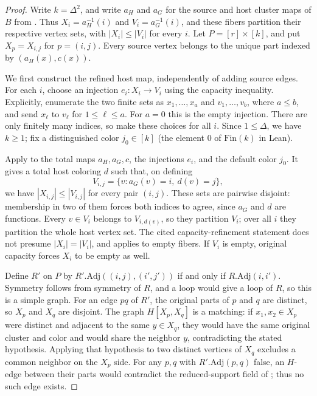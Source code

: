 \begin{proof}
Write $k=\Delta^2$, and write $a_H$ and $a_G$ for the source and host
cluster maps of $B$ from .  Thus
$X_i=a_H^{-1}(i)$ and $V_i=a_G^{-1}(i)$, and these fibers partition
their respective vertex sets, with $|X_i|\leq|V_i|$ for every $i$.
Let $P=[r]\times[k]$, and put $X_p=X_{i,j}$ for $p=(i,j)$.
Every source vertex belongs to the unique part indexed by
$(a_H(x),c(x))$.

We first construct the refined host map, independently of adding source
edges.  For each $i$, choose an injection $e_i:X_i\to V_i$ using the
capacity inequality.  Explicitly, enumerate the two finite sets as
$x_1,\ldots,x_a$ and $v_1,\ldots,v_b$, where $a\leq b$, and send
$x_\ell$ to $v_\ell$ for $1\leq\ell\leq a$.  For $a=0$ this is the
empty injection.  There are only finitely many indices, so make these
choices for all $i$.  Since $1\leq\Delta$, we have $k\geq1$; fix a
distinguished color $j_0\in[k]$ (the element $0$ of $\mathrm{Fin}(k)$
in Lean).

Apply  to the total maps
$a_H,a_G,c$, the injections $e_i$, and the default color $j_0$.
It gives a total host coloring $d$ such that, on defining
\[
 V_{i,j}=\{v:a_G(v)=i,\ d(v)=j\},
\]
we have $|X_{i,j}|\leq|V_{i,j}|$ for every pair $(i,j)$.
These sets are pairwise disjoint: membership in two of them forces both
indices to agree, since $a_G$ and $d$ are functions.  Every $v\in V_i$
belongs to $V_{i,d(v)}$, so they partition $V_i$; over all $i$ they
partition the whole host vertex set.  The cited capacity-refinement
statement does not presume $|X_i|=|V_i|$, and applies to empty fibers.
If $V_i$ is empty, original capacity forces $X_i$ to be empty as well.

Define $R'$ on $P$ by $R'.\mathrm{Adj}((i,j),(i',j'))$ if and only if
$R.\mathrm{Adj}(i,i')$.  Symmetry follows from symmetry of $R$, and a
loop would give a loop of $R$, so this is a simple graph.  For an edge
$pq$ of $R'$, the original parts of $p$ and $q$ are distinct, so $X_p$
and $X_q$ are disjoint.  The graph $H[X_p,X_q]$ is a matching: if
$x_1,x_2\in X_p$ were distinct and adjacent to the same $y\in X_q$,
they would have the same original cluster and color and would share
the neighbor $y$, contradicting the stated hypothesis.  Applying that
hypothesis to two distinct vertices of $X_q$ excludes a common neighbor
on the $X_p$ side.  For any $p,q$ with $R'.\mathrm{Adj}(p,q)$ false,
an $H$-edge between their parts would contradict the reduced-support
field of ; thus no such edge exists.


\end{proof}
